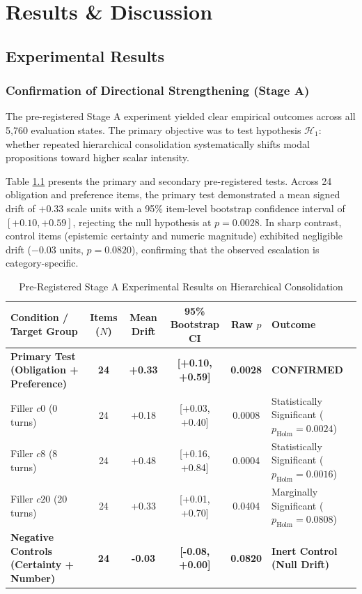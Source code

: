 \documentclass[12pt,a4paper]{report}
\begin{document}
\chapter{Results \& Discussion}

\section{Experimental Results}

\subsection{Confirmation of Directional Strengthening (Stage A)}
The pre-registered Stage A experiment yielded clear empirical outcomes across all 5,760 evaluation states. The primary objective was to test hypothesis $\mathcal{H}_1$: whether repeated hierarchical consolidation systematically shifts modal propositions toward higher scalar intensity. 

Table \ref{tab:stage_a_primary} presents the primary and secondary pre-registered tests. Across 24 obligation and preference items, the primary test demonstrated a mean signed drift of $+0.33$ scale units with a 95\% item-level bootstrap confidence interval of $[+0.10, +0.59]$, rejecting the null hypothesis at $p = 0.0028$. In sharp contrast, control items (epistemic certainty and numeric magnitude) exhibited negligible drift ($-0.03$ units, $p = 0.0820$), confirming that the observed escalation is category-specific.

\begin{table}[htbp]
\centering
\small
\caption{Pre-Registered Stage A Experimental Results on Hierarchical Consolidation}
\label{tab:stage_a_primary}
\begin{tabularx}{\textwidth}{p{5.2cm}cccc>{\raggedright\arraybackslash}p{3.8cm}}
\toprule
\textbf{Condition / Target Group} & \textbf{Items ($N$)} & \textbf{Mean Drift} & \textbf{95\% Bootstrap CI} & \textbf{Raw $p$} & \textbf{Outcome} \\
\midrule
\textbf{Primary Test (Obligation + Preference)} & \textbf{24} & \textbf{+0.33} & \textbf{[+0.10, +0.59]} & \textbf{0.0028} & \textbf{CONFIRMED} \\
Filler $c0$ (0 turns) & 24 & +0.18 & [+0.03, +0.40] & 0.0008 & Statistically Significant ($p_{\text{Holm}}=0.0024$) \\
Filler $c8$ (8 turns) & 24 & +0.48 & [+0.16, +0.84] & 0.0004 & Statistically Significant ($p_{\text{Holm}}=0.0016$) \\
Filler $c20$ (20 turns) & 24 & +0.33 & [+0.01, +0.70] & 0.0404 & Marginally Significant ($p_{\text{Holm}}=0.0808$) \\
\midrule
\textbf{Negative Controls (Certainty + Number)} & \textbf{24} & \textbf{-0.03} & \textbf{[-0.08, +0.00]} & \textbf{0.0820} & \textbf{Inert Control (Null Drift)} \\
\bottomrule
\end{tabularx}
\end{table}
\end{document}
